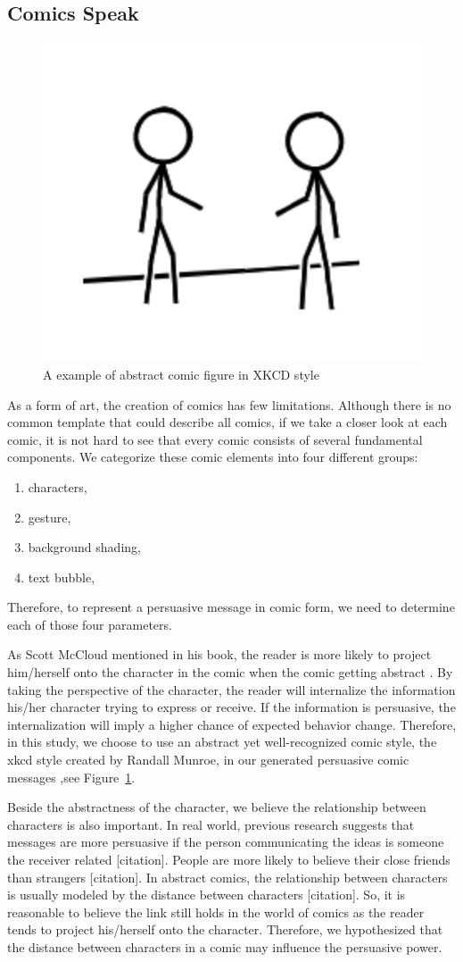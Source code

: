 \subsection{Comics Speak}
\begin{figure}
  \centering
  \includegraphics[width=0.3\columnwidth]{figures/xkcd_example}
  \caption{A example of abstract comic figure in XKCD style}
  \label{fig:xkcd}
\end{figure}

As a form of art, the creation of comics has few limitations. Although there is no common template that could describe all comics, if we take a closer look at each comic, it is not hard to see that every comic consists of several fundamental components. We categorize these comic elements into four different groups:
\begin{enumerate}
 \item	characters,
 \item  gesture,
 \item	background shading,
 \item	text bubble,
\end{enumerate}\par
Therefore, to represent a persuasive message in comic form, we need to determine each of those four parameters.\par
As Scott McCloud mentioned in his book, the reader is more likely to project him/herself onto the character in the comic when the comic getting abstract \cite{scott1993understanding}. By taking the perspective of the character, the reader will internalize the information his/her character trying to express or receive. If the information is persuasive, the internalization will imply a higher chance of expected behavior change. Therefore, in this study, we choose to use an abstract yet well-recognized comic style, the xkcd style created by Randall Munroe, in our generated persuasive comic messages \cite{munroe2009xkcd},see Figure~\ref{fig:xkcd}.\par
Beside the abstractness of the character, we believe the relationship between characters is also important. In real world, previous research suggests that messages are more persuasive if the person communicating the ideas is someone the receiver related [citation]. People are more likely to believe their close friends than strangers [citation]. In abstract comics, the relationship between characters is usually modeled by the distance between characters [citation]. So, it is reasonable to believe the link still holds in the world of comics as the reader tends to project his/herself onto the character. Therefore, we hypothesized that the distance between characters in a comic may influence the persuasive power.\par
